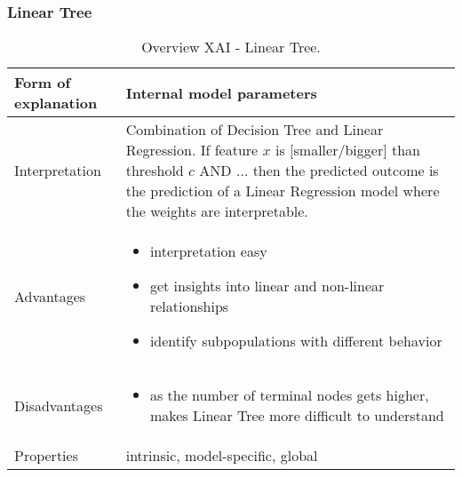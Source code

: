 \subsubsection{Linear Tree}
\begin{table}[H]
  \centering
  \begin{tabular}{|p{}|p{}|}
    \hline
    Form of \newline explanation & 
    Internal model parameters \\
    
    \hline
    Interpretation & 
    Combination of Decision Tree and Linear Regression. If feature $x$ is [smaller/bigger] than threshold $c$ AND $\dots$ then the predicted outcome is the prediction of a Linear Regression model where the weights are interpretable.\\
 
    \hline
    Advantages &
    \begin{itemize}[nosep, left=0em]
        \item interpretation easy
        \item get insights into linear and non-linear relationships
        \item identify subpopulations with different behavior
    \end{itemize} \\
    
    \hline
    Disadvantages &
    \begin{itemize}[nosep, left=0em]
        \item as the number of terminal nodes gets higher,  makes Linear Tree more difficult to understand
    \end{itemize} \\
    
    \hline
    Properties & 
    intrinsic, model-specific, global  \\
    
    \hline
  \end{tabular}
  \caption[Overview XAI - Linear Tree]{Overview XAI - Linear Tree.\cite{linear_tree}}
\end{table}

